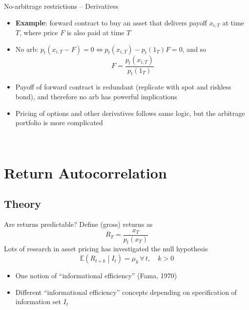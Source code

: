 \documentclass[xcolor=table, aspectratio=169]{beamer}
\begin{document}
\begin{frame}{No-arbitrage restrictions -- Derivatives}
\begin{itemize}
\item \textbf{Example}: forward contract to buy an asset that delivers payoff $x_{i,T}$ at time $T$, where price $F$ is also paid at time $T$
\item No arb: $p_t(x_{i,T}-F) = 0 \Leftrightarrow p_t(x_{i,T}) - p_t(1_T)F = 0$, and so
$$F = \frac{p_t(x_{i,T})}{p_t(1_T)}$$
\item Payoff of forward contract is redundant (replicate with spot and riskless bond), and therefore no arb has powerful implications
\item Pricing of options and other derivatives follows same logic, but the arbitrage portfolio is more complicated
\end{itemize}
\end{frame}

{
\begin{frame}
\begin{center}
\large{
\textcolor{white}{BREAK}    
}
\end{center}
\end{frame}
}

\section{Return Autocorrelation}

\subsection{Theory}
\begin{frame}{Are returns predictable?}
Define (gross) returns as
$$R_{T} = \frac{x_{T}}{p_t(x_T)}$$
Lots of research in asset pricing has investigated the null hypothesis
$$\mathbb{E} \left(R_{t+k} \middle\vert I_t \right) = \mu_k \hspace{2pt} \forall \hspace{2pt} t, \hspace{12pt} k>0$$
\begin{itemize}
\item One notion of ``informational efficiency'' (Fama, 1970)
\item Different ``informational efficiency'' concepts depending on specification of information set $I_t$
\end{itemize}
\end{frame}
\end{document}
